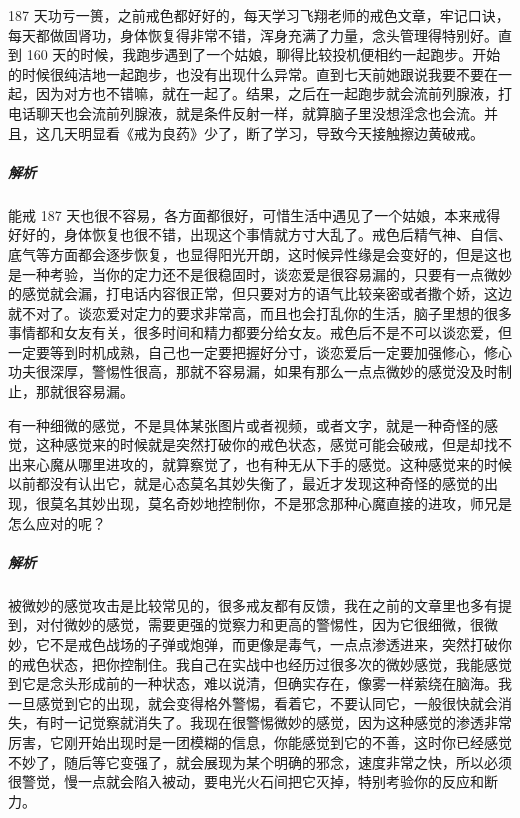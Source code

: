 \begin{case}
    187 天功亏一篑，之前戒色都好好的，每天学习飞翔老师的戒色文章，牢记口诀，每天都做固肾功，身体恢复得非常不错，浑身充满了力量，念头管理得特别好。直到 160 天的时候，我跑步遇到了一个姑娘，聊得比较投机便相约一起跑步。开始的时候很纯洁地一起跑步，也没有出现什么异常。直到七天前她跟说我要不要在一起，因为对方也不错嘛，就在一起了。结果，之后在一起跑步就会流前列腺液，打电话聊天也会流前列腺液，就是条件反射一样，就算脑子里没想淫念也会流。并且，这几天明显看《戒为良药》少了，断了学习，导致今天接触擦边黄破戒。
    \subparagraph{解析} 能戒 187 天也很不容易，各方面都很好，可惜生活中遇见了一个姑娘，本来戒得好好的，身体恢复也很不错，出现这个事情就方寸大乱了。戒色后精气神、自信、底气等方面都会逐步恢复，也显得阳光开朗，这时候异性缘是会变好的，但是这也是一种考验，当你的定力还不是很稳固时，谈恋爱是很容易漏的，只要有一点微妙的感觉就会漏，打电话内容很正常，但只要对方的语气比较亲密或者撒个娇，这边就不对了。谈恋爱对定力的要求非常高，而且也会打乱你的生活，脑子里想的很多事情都和女友有关，很多时间和精力都要分给女友。戒色后不是不可以谈恋爱，但一定要等到时机成熟，自己也一定要把握好分寸，谈恋爱后一定要加强修心，修心功夫很深厚，警惕性很高，那就不容易漏，如果有那么一点点微妙的感觉没及时制止，那就很容易漏。
\end{case}

\begin{case}[稳住你的戒色状态]
    有一种细微的感觉，不是具体某张图片或者视频，或者文字，就是一种奇怪的感觉，这种感觉来的时候就是突然打破你的戒色状态，感觉可能会破戒，但是却找不出来心魔从哪里进攻的，就算察觉了，也有种无从下手的感觉。这种感觉来的时候以前都没有认出它，就是心态莫名其妙失衡了，最近才发现这种奇怪的感觉的出现，很莫名其妙出现，莫名奇妙地控制你，不是邪念那种心魔直接的进攻，师兄是怎么应对的呢？
    \subparagraph{解析} 被微妙的感觉攻击是比较常见的，很多戒友都有反馈，我在之前的文章里也多有提到，对付微妙的感觉，需要更强的觉察力和更高的警惕性，因为它很细微，很微妙，它不是戒色战场的子弹或炮弹，而更像是毒气，一点点渗透进来，突然打破你的戒色状态，把你控制住。我自己在实战中也经历过很多次的微妙感觉，我能感觉到它是念头形成前的一种状态，难以说清，但确实存在，像雾一样萦绕在脑海。我一旦感觉到它的出现，就会变得格外警惕，看着它，不要认同它，一般很快就会消失，有时一记觉察就消失了。我现在很警惕微妙的感觉，因为这种感觉的渗透非常厉害，它刚开始出现时是一团模糊的信息，你能感觉到它的不善，这时你已经感觉不妙了，随后等它变强了，就会展现为某个明确的邪念，速度非常之快，所以必须很警觉，慢一点就会陷入被动，要电光火石间把它灭掉，特别考验你的反应和断力。
\end{case}

